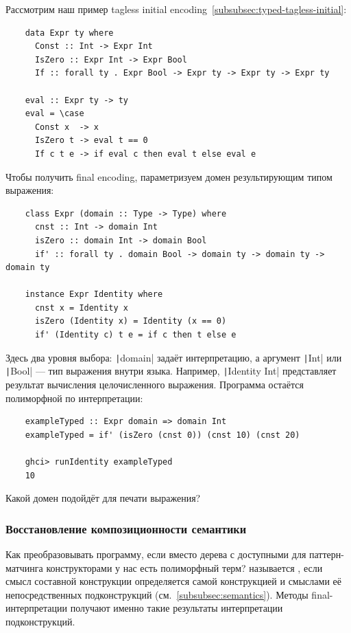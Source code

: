 Рассмотрим наш пример tagless initial encoding~\ref{subsubsec:typed-tagless-initial}:
\begin{verbatim}
    data Expr ty where
      Const :: Int -> Expr Int
      IsZero :: Expr Int -> Expr Bool
      If :: forall ty . Expr Bool -> Expr ty -> Expr ty -> Expr ty

    eval :: Expr ty -> ty
    eval = \case
      Const x  -> x
      IsZero t -> eval t == 0
      If c t e -> if eval c then eval t else eval e
\end{verbatim}
Чтобы получить final encoding, параметризуем домен результирующим типом выражения:
\begin{verbatim}
    class Expr (domain :: Type -> Type) where
      cnst :: Int -> domain Int
      isZero :: domain Int -> domain Bool
      if' :: forall ty . domain Bool -> domain ty -> domain ty -> domain ty

    instance Expr Identity where
      cnst x = Identity x
      isZero (Identity x) = Identity (x == 0)
      if' (Identity c) t e = if c then t else e
\end{verbatim}

Здесь два уровня выбора: \texttt|domain| задаёт интерпретацию, а аргумент \texttt|Int| или \texttt|Bool| --- тип выражения внутри языка.
Например, \texttt|Identity Int| представляет результат вычисления целочисленного выражения.
Программа остаётся полиморфной по интерпретации:
\begin{verbatim}
    exampleTyped :: Expr domain => domain Int
    exampleTyped = if' (isZero (cnst 0)) (cnst 10) (cnst 20)

    ghci> runIdentity exampleTyped
    10
\end{verbatim}

\begin{task}
    Какой домен подойдёт для печати выражения?
\end{task}

\subsubsection{Восстановление композиционности семантики} \label{subsubsec:recover-compositionality}

Как преобразовывать программу, если вместо дерева с доступными для паттерн-матчинга конструкторами у нас есть полиморфный терм?
 называется , если смысл составной конструкции определяется самой конструкцией и смыслами её непосредственных подконструкций (см.~\ref{subsubsec:semantics}).
Методы final-интерпретации получают именно такие результаты интерпретации подконструкций.

